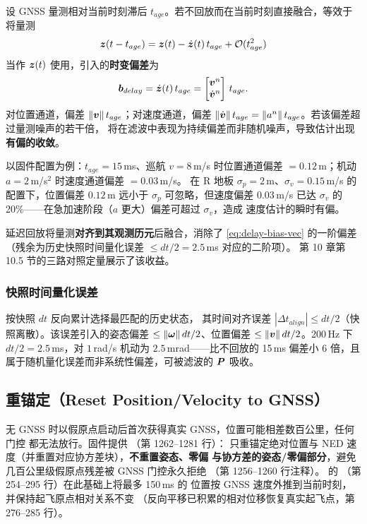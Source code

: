 设 GNSS 量测相对当前时刻滞后 $t_{age}$。若不回放而在当前时刻直接融合，等效于
将量测
\begin{equation}
  \boldsymbol{z}(t - t_{age}) = \boldsymbol{z}(t) - \dot{\boldsymbol{z}}(t)\,t_{age}
    + \mathcal{O}(t_{age}^2)
  \label{eq:delay-bias}
\end{equation}
当作 $\boldsymbol{z}(t)$ 使用，引入的\textbf{时变偏差}为
\begin{equation}
  \boldsymbol{b}_{delay} = \dot{\boldsymbol{z}}(t)\,t_{age}
  = \begin{bmatrix} \boldsymbol{v}^n \\ \dot{\boldsymbol{v}}^n \end{bmatrix}\,t_{age}.
  \label{eq:delay-bias-vec}
\end{equation}
对位置通道，偏差 $\|\boldsymbol{v}\|\,t_{age}$；对速度通道，偏差
$\|\dot{\boldsymbol{v}}\|\,t_{age} = \|a^n\|\,t_{age}$。若该偏差超过量测噪声的若干倍，
将在滤波中表现为持续偏差而非随机噪声，导致估计出现\textbf{有偏的收敛}。

以固件配置为例：$t_{age} = 15$\,ms、巡航 $v = 8$\,m/s 时位置通道偏差
$= 0.12$\,m；机动 $a = 2$\,m/s$^2$ 时速度通道偏差 $= 0.03$\,m/s。
在 R 地板 $\sigma_p = 2$\,m、$\sigma_v = 0.15$\,m/s 的配置下，位置偏差
$0.12$\,m 远小于 $\sigma_p$ 可忽略，但速度偏差 $0.03$\,m/s 已达
$\sigma_v$ 的 20\%——在急加速阶段（$a$ 更大）偏差可超过 $\sigma_v$，造成
速度估计的瞬时有偏。

延迟回放将量测\textbf{对齐到其观测历元}后融合，消除了 \cref{eq:delay-bias-vec}
的一阶偏差（残余为历史快照时间量化误差 $\le dt/2 = 2.5$\,ms 对应的二阶项）。
第 10 章第 10.5 节的三路对照定量展示了该收益。

\subsubsection{快照时间量化误差}

 按快照 $dt$ 反向累计选择最匹配的历史状态，
其时间对齐误差 $|\Delta t_{align}| \le dt/2$（快照离散）。该误差引入的姿态偏差
$\le \|\boldsymbol{\omega}\|\,dt/2$、位置偏差 $\le \|\boldsymbol{v}\|\,dt/2$。200\,Hz 下
$dt/2 = 2.5$\,ms，对 $1$\,rad/s 机动为 $2.5$\,mrad——比不回放的 15\,ms
偏差小 6 倍，且属于随机量化误差而非系统性偏差，可被滤波的 $\boldsymbol{P}$ 吸收。

\subsection{重锚定（Reset Position/Velocity to GNSS）}

无 GNSS 时以假原点启动后首次获得真实 GNSS，位置可能相差数百公里，任何门控
都无法放行。固件提供 （第 1262--1281 行）：
只重锚定绝对位置与 NED 速度（并重置对应协方差块），\textbf{不重置姿态、零偏
与协方差的姿态/零偏部分}，避免几百公里级假原点残差被 GNSS 门控永久拒绝
（第 1256--1260 行注释）。 的
（第 254--295 行）在此基础上将最多 150\,ms 的
位置按 GNSS 速度外推到当前时刻，并保持起飞原点相对关系不变
（反向平移已积累的相对位移恢复真实起飞点，第 276--285 行）。

